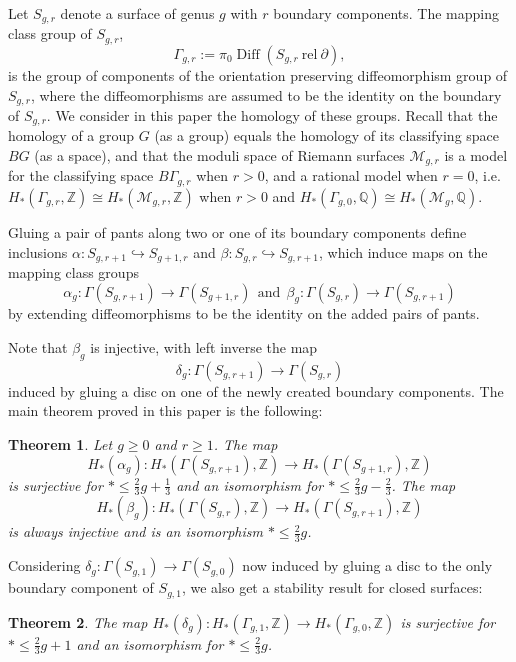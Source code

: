 \documentclass[10pt]{amsart}
\newtheorem{thm}{Theorem}[section]
\newcommand{\M}{\mathcal{M}}
\newcommand{\QQ}{\mathbb{Q}}
\newcommand{\Z}{\mathbb{Z}}
\newcommand{\al}{\alpha}
\newcommand{\be}{\beta}
\newcommand{\Ga}{\Gamma}
\newcommand{\inc}{\hookrightarrow}
\newcommand{\del}{\partial}
\newcommand{\Dif}{\operatorname{Diff}}
\begin{document}
\smallskip

Let $S_{g,r}$ denote a surface of genus $g$ with $r$ boundary components. The mapping class group of $S_{g,r}$,
$$\Ga_{g,r}:=\pi_0\Dif(S_{g,r}\ \textrm{rel}\ \del),$$
is the group of components of the orientation preserving diffeomorphism group of $S_{g,r}$, where the diffeomorphisms are assumed to be the identity on the
boundary of $S_{g,r}$.  We consider in this paper the homology of these groups. Recall that the homology of a group $G$ (as
a group) equals the homology of its classifying space $BG$ (as a space), and that the moduli space of Riemann surfaces 
$\M_{g,r}$ is a model for the classifying space $B\Ga_{g,r}$ when $r>0$, and a rational model when $r=0$, i.e.~ 
$H_*(\Ga_{g,r},\Z)\cong H_*(\M_{g,r},\Z)$ when $r>0$ and $H_*(\Ga_{g,0},\QQ)\cong H_*(\M_{g},\QQ)$. 


Gluing a pair of pants along two or one of its boundary components define inclusions
$\al\colon  S_{g,r+1}\inc S_{g+1,r}$ and $\beta\colon S_{g,r}\inc S_{g,r+1}$, which 
induce maps on the mapping class groups
$$\al_g\colon  \Ga(S_{g,r+1})\to \Ga(S_{g+1,r}) \ \ \textrm{and}\ \  \beta_g\colon \Ga(S_{g,r})\to \Ga(S_{g,r+1})$$
by extending diffeomorphisms to be the identity on the added pairs of pants. 

Note that $\be_g$ is injective, with left inverse the map 
$$\delta_g\colon  \Ga(S_{g,r+1})\to \Ga(S_{g,r})$$
induced by gluing a disc on one of the newly created boundary components. 
The main theorem proved in this paper is the following:

\begin{thm}\label{main}
Let $g\ge 0$ and $r\ge 1$. The map $$H_*(\al_g)\colon H_*(\Ga(S_{g,r+1}),\Z)\to H_*(\Ga(S_{g+1,r}),\Z)$$ 
is surjective for $*\le \frac{2}{3}g+\frac{1}{3}$ and an isomorphism for 
$*\le \frac{2}{3}g-\frac{2}{3}$. The map 
$$H_*(\beta_g)\colon H_*(\Ga(S_{g,r}),\Z)\to H_*(\Ga(S_{g,r+1}),\Z)$$ 
is always injective and is an isomorphism $*\le\frac{2}{3}g$. 
\end{thm}



Considering $\delta_g\colon \Ga(S_{g,1})\to \Ga(S_{g,0})$ now induced by gluing a disc to the only boundary component 
of $S_{g,1}$, we also get a stability result for closed surfaces: 


\begin{thm}\label{mainclosed}
The map $H_*(\delta_g)\colon H_*(\Ga_{g,1},\Z)\to H_*(\Ga_{g,0},\Z)$ is
surjective for $*\le \frac{2}{3}g+1$ and an isomorphism for $*\le \frac{2}{3}g$.  
\end{thm}
\end{document}
